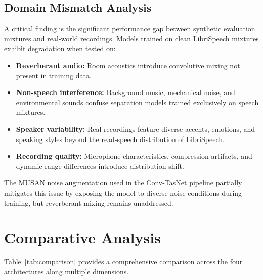 \documentclass[conference]{IEEEtran}
\begin{document}
\subsection{Domain Mismatch Analysis}

A critical finding is the significant performance gap between synthetic evaluation mixtures and real-world recordings. Models trained on clean LibriSpeech mixtures exhibit degradation when tested on:

\begin{itemize}[leftmargin=*,nosep]
    \item \textbf{Reverberant audio:} Room acoustics introduce convolutive mixing not present in training data.
    \item \textbf{Non-speech interference:} Background music, mechanical noise, and environmental sounds confuse separation models trained exclusively on speech mixtures.
    \item \textbf{Speaker variability:} Real recordings feature diverse accents, emotions, and speaking styles beyond the read-speech distribution of LibriSpeech.
    \item \textbf{Recording quality:} Microphone characteristics, compression artifacts, and dynamic range differences introduce distribution shift.
\end{itemize}

The MUSAN noise augmentation used in the Conv-TasNet pipeline partially mitigates this issue by exposing the model to diverse noise conditions during training, but reverberant mixing remains unaddressed.

\section{Comparative Analysis}
\label{sec:comparison}

Table~\ref{tab:comparison} provides a comprehensive comparison across the four architectures along multiple dimensions.
\end{document}

